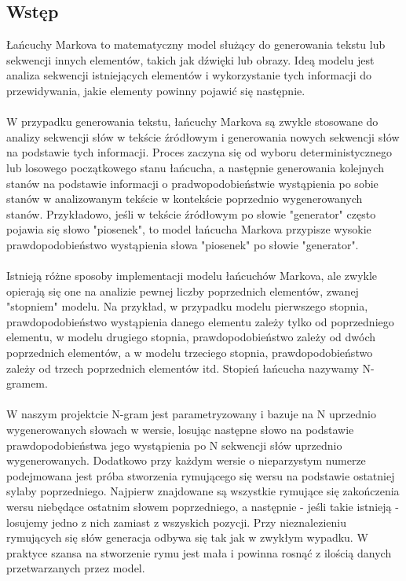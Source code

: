 \documentclass{article}
\begin{document}
\subsection{Wstęp}
Łańcuchy Markova to matematyczny model służący do generowania tekstu lub sekwencji innych elementów, takich jak dźwięki lub obrazy. Ideą modelu jest analiza sekwencji istniejących elementów i wykorzystanie tych informacji do przewidywania, jakie elementy powinny pojawić się następnie. \\
\\
W przypadku generowania tekstu, łańcuchy Markova są zwykle stosowane do analizy sekwencji słów w tekście źródłowym i generowania nowych sekwencji słów na podstawie tych informacji. Proces zaczyna się od wyboru deterministycznego lub losowego początkowego stanu łańcucha, a następnie generowania kolejnych stanów na podstawie informacji o pradwopodobieństwie wystąpienia po sobie stanów w analizowanym tekście w kontekście poprzednio wygenerowanych stanów. Przykładowo, jeśli w tekście źródłowym po słowie "generator" często pojawia się słowo "piosenek", to model łańcucha Markova przypisze wysokie prawdopodobieństwo wystąpienia słowa "piosenek" po słowie "generator". \\
\\
Istnieją różne sposoby implementacji modelu łańcuchów Markova, ale zwykle opierają się one na analizie pewnej liczby poprzednich elementów, zwanej "stopniem" modelu. Na przykład, w przypadku modelu pierwszego stopnia, prawdopodobieństwo wystąpienia danego elementu zależy tylko od poprzedniego elementu, w modelu drugiego stopnia, prawdopodobieństwo zależy od dwóch poprzednich elementów, a w modelu trzeciego stopnia, prawdopodobieństwo zależy od trzech poprzednich elementów itd. Stopień łańcucha nazywamy N-gramem.\\
\\
W naszym projektcie N-gram jest parametryzowany i bazuje na N uprzednio wygenerowanych słowach w wersie, losując następne słowo na podstawie prawdopodobieństwa jego wystąpienia po N sekwencji słów uprzednio wygenerowanych. Dodatkowo przy każdym wersie o nieparzystym numerze podejmowana jest próba stworzenia rymującego się wersu na podstawie ostatniej sylaby poprzedniego. Najpierw znajdowane są wszystkie rymujące się zakończenia wersu niebędące ostatnim słowem poprzedniego, a następnie - jeśli takie istnieją - losujemy jedno z nich zamiast z wszyskich pozycji. Przy nieznalezieniu rymujących się słów generacja odbywa się tak jak w zwykłym wypadku. W praktyce szansa na stworzenie rymu jest mała i powinna rosnąć z ilością danych przetwarzanych przez model.\\
\end{document}
